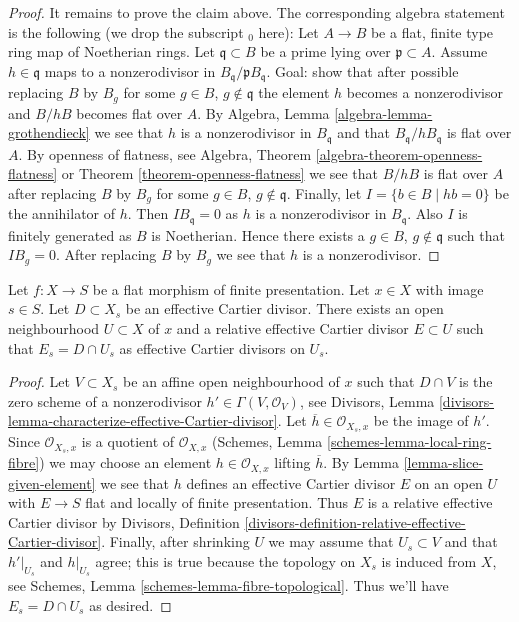 \begin{proof}
\medskip\noindent
It remains to prove the claim above. The corresponding algebra statement
is the following (we drop the subscript ${}_0$ here):
Let $A \to B$ be a flat, finite type ring map of Noetherian rings.
Let $\mathfrak q \subset B$ be a prime lying over $\mathfrak p \subset A$.
Assume $h \in \mathfrak q$ maps to a nonzerodivisor in
$B_{\mathfrak q}/\mathfrak p B_{\mathfrak q}$.
Goal: show that after possible replacing $B$ by $B_g$ for some
$g \in B$, $g \not \in \mathfrak q$ the element $h$ becomes a nonzerodivisor
and $B/hB$ becomes flat over $A$. By
Algebra, Lemma \ref{algebra-lemma-grothendieck}
we see that $h$ is a nonzerodivisor in $B_{\mathfrak q}$ and that
$B_{\mathfrak q}/hB_{\mathfrak q}$ is flat over $A$.
By openness of flatness, see
Algebra, Theorem \ref{algebra-theorem-openness-flatness}
or
Theorem \ref{theorem-openness-flatness}
we see that $B/hB$ is flat over $A$ after replacing $B$ by $B_g$ for some
$g \in B$, $g \not \in \mathfrak q$. Finally, let
$I = \{b \in B \mid hb = 0\}$ be the annihilator of $h$. Then
$IB_{\mathfrak q} = 0$ as $h$ is a nonzerodivisor in $B_{\mathfrak q}$.
Also $I$ is finitely generated as $B$ is Noetherian.
Hence there exists a $g \in B$, $g \not \in \mathfrak q$ such that $IB_g = 0$.
After replacing $B$ by $B_g$ we see that $h$ is a nonzerodivisor.
\end{proof}

\begin{lemma}
\label{lemma-construct-relative-divisors}
Let $f : X \to S$ be a flat morphism of finite presentation.
Let $x \in X$ with image $s \in S$. Let $D \subset X_s$ be an
effective Cartier divisor. There exists an open neighbourhood
$U \subset X$ of $x$ and a relative effective Cartier divisor
$E \subset U$ such that $E_s = D \cap U_s$ as effective Cartier
divisors on $U_s$.
\end{lemma}

\begin{proof}
Let $V \subset X_s$ be an affine open neighbourhood of $x$
such that $D \cap V$ is the zero scheme of a nonzerodivisor
$h' \in \Gamma(V, \mathcal{O}_V)$, see
Divisors, Lemma \ref{divisors-lemma-characterize-effective-Cartier-divisor}.
Let $\overline{h} \in \mathcal{O}_{X_s, x}$ be the image of $h'$.
Since $\mathcal{O}_{X_s, x}$ is a quotient of $\mathcal{O}_{X, x}$
(Schemes, Lemma \ref{schemes-lemma-local-ring-fibre})
we may choose an element $h \in \mathcal{O}_{X, x}$ lifting $\overline{h}$.
By Lemma \ref{lemma-slice-given-element} we see that
$h$ defines an effective Cartier divisor $E$ on an open $U$
with $E \to S$ flat and locally of finite presentation.
Thus $E$ is a relative effective Cartier divisor by
Divisors, Definition
\ref{divisors-definition-relative-effective-Cartier-divisor}.
Finally, after shrinking $U$ we may assume that $U_s \subset V$
and that $h'|_{U_s}$ and $h|_{U_s}$ agree; this is true because
the topology on $X_s$ is induced from $X$, see
Schemes, Lemma \ref{schemes-lemma-fibre-topological}.
Thus we'll have $E_s = D \cap U_s$ as desired.
\end{proof}

